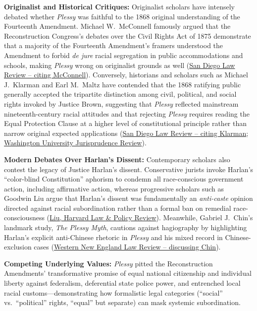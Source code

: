 \documentclass[12pt]{article}
\begin{document}
\textbf{Originalist and Historical Critiques:} Originalist scholars have intensely debated whether \textit{Plessy} was faithful to the 1868 original understanding of the Fourteenth Amendment. Michael W.\ McConnell famously argued that the Reconstruction Congress's debates over the Civil Rights Act of 1875 demonstrate that a majority of the Fourteenth Amendment's framers understood the Amendment to forbid \textit{de jure} racial segregation in public accommodations and schools, making \textit{Plessy} wrong on originalist grounds as well (\href{https://digital.sandiego.edu/cgi/viewcontent.cgi?article=3165&context=sdlr}{San Diego Law Review -- citing McConnell}). Conversely, historians and scholars such as Michael J.\ Klarman and Earl M.\ Maltz have contended that the 1868 ratifying public generally accepted the tripartite distinction among civil, political, and social rights invoked by Justice Brown, suggesting that \textit{Plessy} reflected mainstream nineteenth-century racial attitudes and that rejecting \textit{Plessy} requires reading the Equal Protection Clause at a higher level of constitutional principle rather than narrow original expected applications (\href{https://digital.sandiego.edu/cgi/viewcontent.cgi?article=3165&context=sdlr}{San Diego Law Review -- citing Klarman}; \href{https://journals.library.wustl.edu/jurisprudence/article/2090/galley/18923/view/}{Washington University Jurisprudence Review}).

\textbf{Modern Debates Over Harlan's Dissent:} Contemporary scholars also contest the legacy of Justice Harlan's dissent. Conservative jurists invoke Harlan's ``color-blind Constitution'' aphorism to condemn all race-conscious government action, including affirmative action, whereas progressive scholars such as Goodwin Liu argue that Harlan's dissent was fundamentally an \textit{anti-caste} opinion directed against racial subordination rather than a formal ban on remedial race-consciousness (\href{https://journals.law.harvard.edu/lpr/wp-content/uploads/sites/89/2013/05/2.1_3_Liu.pdf}{Liu, Harvard Law \& Policy Review}). Meanwhile, Gabriel J.\ Chin's landmark study, \textit{The Plessy Myth}, cautions against hagiography by highlighting Harlan's explicit anti-Chinese rhetoric in \textit{Plessy} and his mixed record in Chinese-exclusion cases (\href{https://digitalcommons.wne.edu/cgi/viewcontent.cgi?article=1725&context=lawreview}{Western New England Law Review -- discussing Chin}).

\textbf{Competing Underlying Values:} \textit{Plessy} pitted the Reconstruction Amendments' transformative promise of equal national citizenship and individual liberty against federalism, deferential state police power, and entrenched local racial customs---demonstrating how formalistic legal categories (``social'' vs.\ ``political'' rights, ``equal'' but separate) can mask systemic subordination.
\end{document}
